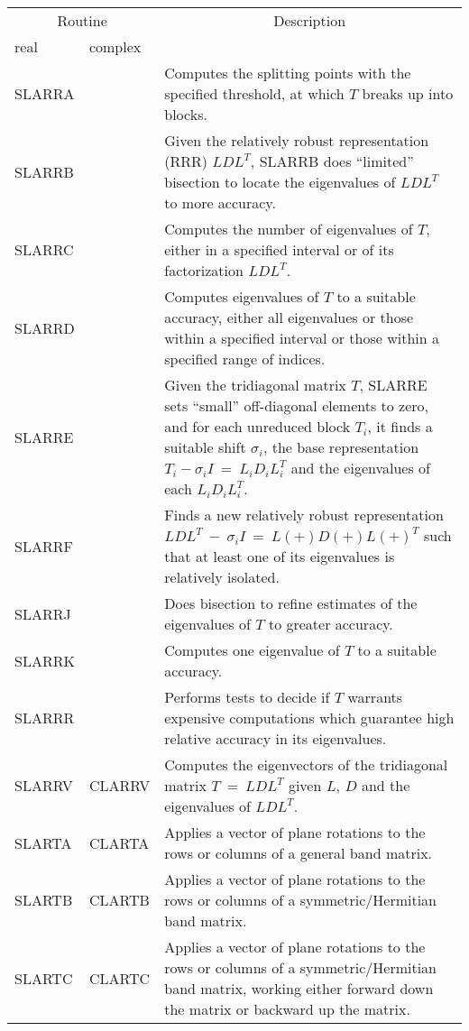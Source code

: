 \begin{center}
\begin{tabular}{| l   p{0.75in} |p{4.5in}    |}
\hline \multicolumn{2}{|c|}{Routine}&\multicolumn{1}{c|}{Description} \\ 
\cline{1-2} real&complex&\\
\hline \hline
SLARRA& &
Computes the splitting points with the specified threshold,
at which $T$ breaks up into blocks. \\
SLARRB& &
Given the relatively robust representation (RRR) $L D L^T$, SLARRB
does ``limited'' bisection to locate the eigenvalues of $L D L^T$ to more accuracy. \\
SLARRC& &
Computes the number of eigenvalues of $T$, either in a specified interval
or of its factorization $L D L^T$. \\
SLARRD& &
Computes eigenvalues of $T$ to a suitable accuracy, either all eigenvalues
or those within a specified interval or those within a specified range of indices. \\ 
SLARRE& &
Given the tridiagonal matrix $T$, SLARRE sets ``small'' off-diagonal
elements to zero, and for each unreduced block $T_i$, it finds
a suitable shift $\sigma_i$, the base representation $T_i - \sigma_i I~=~L_i D_i L_i^T$ 
and the eigenvalues of each $L_i D_i L_i^T$. \\
SLARRF& &
Finds a new relatively robust representation
$L D L^T~-~\sigma_i  I~=~L(+) D(+) L(+)^T$ such that at least one of its
eigenvalues is relatively isolated. \\
SLARRJ& &
Does bisection to refine estimates of the eigenvalues of $T$ to greater accuracy. \\
SLARRK& &
Computes one eigenvalue of $T$ to a suitable accuracy. \\
SLARRR& &
Performs tests to decide if $T$ warrants expensive computations
which guarantee high relative accuracy in its eigenvalues. \\
SLARRV& CLARRV&
Computes the eigenvectors of the tridiagonal matrix
$T~=~L D L^T$ given $L$, $D$ and the eigenvalues of $L D L^T$.\\
SLARTA&CLARTA&
Applies a vector of plane rotations to the rows or columns of a general band matrix.\\
SLARTB&CLARTB&
Applies a vector of plane rotations to the rows or columns of a symmetric/Hermitian band matrix.\\
SLARTC&CLARTC&
Applies a vector of plane rotations to the rows or columns of a symmetric/Hermitian band matrix,
working either forward down the matrix or backward up the matrix.\\

\end{tabular}
\end{center}
